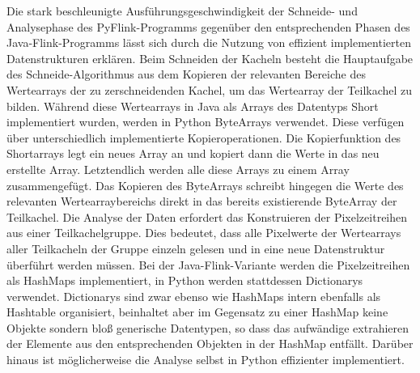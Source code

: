 Die stark beschleunigte Ausführungsgeschwindigkeit der Schneide- und Analysephase des PyFlink-Programms gegenüber den entsprechenden Phasen des Java-Flink-Programms lässt sich durch die Nutzung von effizient implementierten Datenstrukturen erklären. Beim Schneiden der Kacheln besteht die Hauptaufgabe des Schneide-Algorithmus aus dem Kopieren der relevanten Bereiche des Wertearrays der zu zerschneidenden Kachel, um das Wertearray der Teilkachel zu bilden. Während diese Wertearrays in Java als Arrays des Datentyps Short implementiert wurden, werden in Python ByteArrays verwendet. Diese verfügen über unterschiedlich implementierte Kopieroperationen. Die Kopierfunktion des Shortarrays legt ein neues Array an und kopiert dann die Werte in das neu erstellte Array. Letztendlich werden alle diese Arrays zu einem Array zusammengefügt. Das Kopieren des ByteArrays schreibt hingegen die Werte des relevanten Wertearraybereichs direkt in das bereits existierende ByteArray der Teilkachel. 
Die Analyse der Daten erfordert das Konstruieren der Pixelzeitreihen aus einer Teilkachelgruppe. Dies bedeutet, dass alle Pixelwerte der Wertearrays aller Teilkacheln der Gruppe einzeln gelesen und in eine neue Datenstruktur überführt werden müssen. Bei der Java-Flink-Variante werden die Pixelzeitreihen als HashMaps implementiert, in Python werden stattdessen Dictionarys verwendet. Dictionarys sind zwar ebenso wie HashMaps intern ebenfalls als Hashtable organisiert, beinhaltet aber im Gegensatz zu einer HashMap keine Objekte sondern bloß generische Datentypen, so dass das aufwändige extrahieren der Elemente aus den entsprechenden Objekten in der HashMap entfällt. Darüber hinaus ist möglicherweise die Analyse selbst in Python effizienter implementiert.

